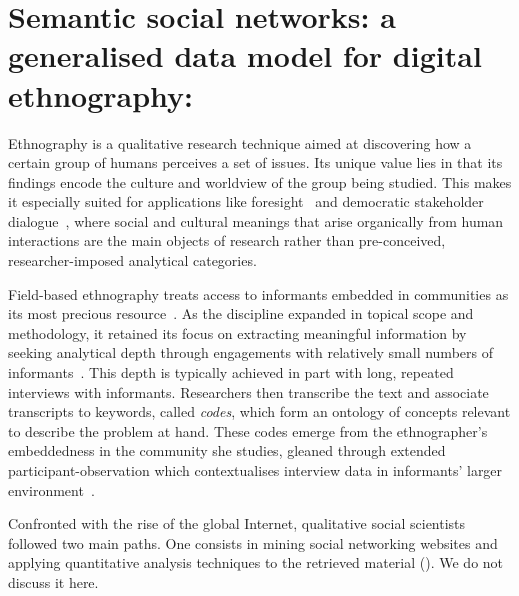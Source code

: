 \documentclass{llncs}
\begin{document}
\section{Semantic social networks: a generalised data model for digital ethnography: } \label{sec:data:model}

Ethnography is a qualitative research technique aimed at discovering how a certain group of humans perceives a set of issues. Its unique value lies in that its findings encode the culture and worldview of the group being studied. This makes it especially suited for applications like foresight~\cite{barben200838} and democratic stakeholder dialogue~\cite{conley2005engage,wolford2007confusion}, where social and cultural meanings that arise organically from human interactions are the main objects of research rather than pre-conceived, researcher-imposed analytical categories.

Field-based ethnography treats access to informants embedded in communities as its most precious resource~\cite{Geertz1973}. As the discipline expanded in topical scope and methodology, it retained its focus on extracting meaningful information by seeking analytical depth through engagements with relatively small numbers of informants~\cite{Abu-Lughod1991}. This depth is typically achieved in part with long, repeated interviews with informants. Researchers then transcribe the text and associate transcripts to keywords, called \emph{codes}, which form an ontology of concepts relevant to describe the problem at hand. These codes emerge from the ethnographer's embeddedness in the community she studies, gleaned through extended participant-observation which contextualises interview data in informants' larger environment~\cite{Emerson2011,Goffman1989}. 

Confronted with the rise of the global Internet, qualitative social scientists followed two main paths. One consists in mining social networking websites and applying quantitative analysis techniques to the retrieved material (\cite{Munk2016,Hollstein2011}). We do not discuss it here.
\end{document}
